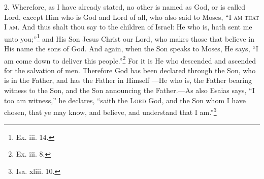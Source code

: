 2. Wherefore, as I have already stated, no other is named as God, or is called Lord, except Him who is God and Lord of all, who also said to Moses, “\textsc{I am that I am}. And thus shalt thou say to the children of Israel: He who is, hath sent me unto you;”\footnote{Ex. iii. 14.} and His Son Jesus Christ our Lord, who makes those that believe in His name the sons of God. And again, when the Son speaks to Moses, He says, “I am come down to deliver this people.”\footnote{Ex. iii. 8.} For it is He who descended and ascended for the salvation of men. Therefore God has been declared through the Son, who is in the Father, and has the Father in Himself —He who is, the Father bearing witness to the Son, and the Son announcing the Father.—As also Esaias says, “I too am witness,” he declares, “saith the \textsc{Lord} God, and the Son whom I have chosen, that ye may know, and believe, and understand that I am.”\footnote{Isa. xliii. 10.}

